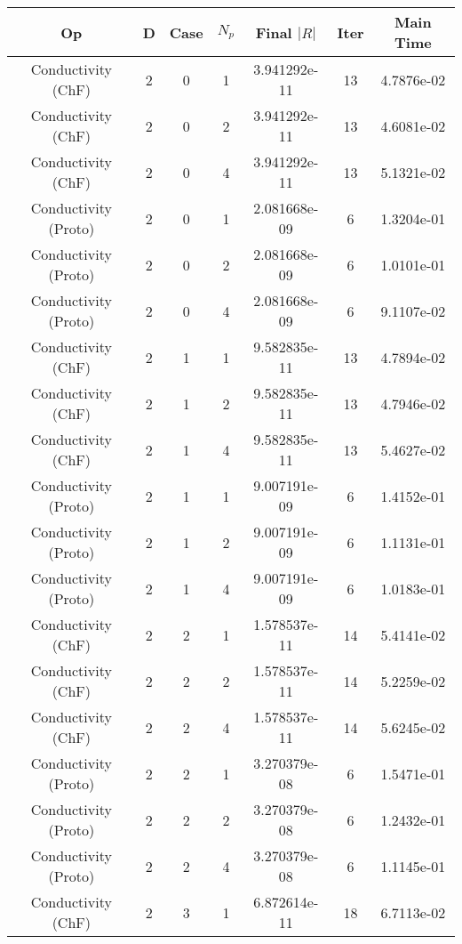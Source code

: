 \documentclass{article}
\begin{document}
\begin{small} 
  \begin{table} 
    \begin{center}
      \begin{tabular}{|c|c|c|c|c|c||c|} \hline 
Op & D & Case & $N_p$ & Final $|R|$  &  Iter & Main Time \\  
        \hline 
        Conductivity    (ChF) & 2 & 0 & 1& 3.941292e-11 & 13 & 4.7876e-02\\
        Conductivity    (ChF) & 2 & 0 & 2& 3.941292e-11 & 13 & 4.6081e-02\\
        Conductivity    (ChF) & 2 & 0 & 4& 3.941292e-11 & 13 & 5.1321e-02\\
        Conductivity  (Proto) & 2 & 0 & 1& 2.081668e-09 & 6 & 1.3204e-01\\
        Conductivity  (Proto) & 2 & 0 & 2& 2.081668e-09 & 6 & 1.0101e-01\\
        Conductivity  (Proto) & 2 & 0 & 4& 2.081668e-09 & 6 & 9.1107e-02\\
        \hline 
        Conductivity    (ChF) & 2 & 1 & 1& 9.582835e-11 & 13 & 4.7894e-02\\
        Conductivity    (ChF) & 2 & 1 & 2& 9.582835e-11 & 13 & 4.7946e-02\\
        Conductivity    (ChF) & 2 & 1 & 4& 9.582835e-11 & 13 & 5.4627e-02\\
        Conductivity  (Proto) & 2 & 1 & 1& 9.007191e-09 & 6 & 1.4152e-01\\
        Conductivity  (Proto) & 2 & 1 & 2& 9.007191e-09 & 6 & 1.1131e-01\\
        Conductivity  (Proto) & 2 & 1 & 4& 9.007191e-09 & 6 & 1.0183e-01\\
        \hline 
        Conductivity    (ChF) & 2 & 2 & 1& 1.578537e-11 & 14 & 5.4141e-02\\
        Conductivity    (ChF) & 2 & 2 & 2& 1.578537e-11 & 14 & 5.2259e-02\\
        Conductivity    (ChF) & 2 & 2 & 4& 1.578537e-11 & 14 & 5.6245e-02\\
        Conductivity  (Proto) & 2 & 2 & 1& 3.270379e-08 & 6 & 1.5471e-01\\
        Conductivity  (Proto) & 2 & 2 & 2& 3.270379e-08 & 6 & 1.2432e-01\\
        Conductivity  (Proto) & 2 & 2 & 4& 3.270379e-08 & 6 & 1.1145e-01\\
        \hline 
        Conductivity    (ChF) & 2 & 3 & 1& 6.872614e-11 & 18 & 6.7113e-02\\

\end{tabular}
\end{center}
\end{table}
\end{small}
\end{document}
